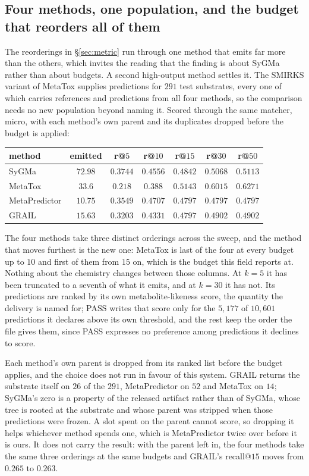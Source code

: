 \subsection{Four methods, one population, and the budget that reorders all of them}
\label{app:fourmethod}

The reorderings in \S\ref{sec:metric} run through one method that emits far more than the others,
which invites the reading that the finding is about SyGMa rather than about budgets. A second
high-output method settles it. The SMIRKS variant of MetaTox supplies predictions for $291$ test
substrates, every one of which carries references and predictions from all four methods, so the
comparison needs no new population beyond naming it. Scored through the same matcher, micro, with
each method's own parent and its duplicates dropped before the budget is applied:

\begin{center}
\small
\begin{tabular}{lcccccc}
\toprule
method & emitted & r@$5$ & r@$10$ & r@$15$ & r@$30$ & r@$50$ \\
\midrule
SyGMa          & $72.98$ & $0.3744$ & $0.4556$ & $0.4842$ & $0.5068$ & $0.5113$ \\
MetaTox        & $33.6$ & $0.218$ & $0.388$ & $0.5143$ & $0.6015$ & $0.6271$ \\
MetaPredictor  & $10.75$ & $0.3549$ & $0.4707$ & $0.4797$ & $0.4797$ & $0.4797$ \\
GRAIL          & $15.63$ & $0.3203$ & $0.4331$ & $0.4797$ & $0.4902$ & $0.4902$ \\
\bottomrule
\end{tabular}
\end{center}

The four methods take three distinct orderings across the sweep, and the method that moves
furthest is the new one: MetaTox is last of the four at every budget up to $10$ and first of them
from $15$ on, which is the budget this field reports at. Nothing about the chemistry changes
between those columns. At $k=5$ it has been truncated to a seventh of what it emits, and at $k=30$
it has not. Its predictions are ranked by its own metabolite-likeness score, the quantity the
delivery is named for; PASS writes that score only for the $5{,}177$ of $10{,}601$ predictions it
declares above its own threshold, and the rest keep the order the file gives them, since PASS
expresses no preference among predictions it declines to score.

Each method's own parent is dropped from its ranked list before the budget applies, and the choice does not run in favour of this system. GRAIL returns the substrate itself on $26$ of the $291$, MetaPredictor on
$52$ and MetaTox on $14$; SyGMa's zero is a property of the released artifact
rather than of SyGMa, whose tree is rooted at the substrate and whose parent was stripped when those
predictions were frozen. A slot spent on the parent cannot score, so dropping it helps whichever
method spends one, which is MetaPredictor twice over before it is ours. It does not carry the result: with the parent left in,
the four methods take the same three orderings at the same budgets and GRAIL's recall@$15$ moves
from $0.265$ to $0.263$.

